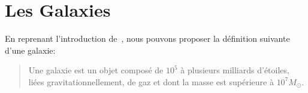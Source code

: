 



	\section{Les Galaxies}%
		En reprenant l'introduction de~\cite{binntre},
		nous pouvons proposer la définition suivante d'une galaxie:
		\begin{quote}
			Une galaxie est un objet composé de $10^5$ à plusieurs milliards d'étoiles, liées gravitationnellement, de gaz et dont la masse
			est supérieure à $10^7M_\odot$.
		\end{quote}

